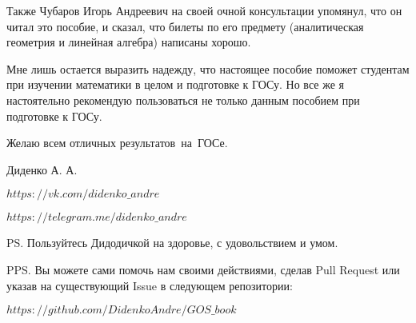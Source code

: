 Также Чубаров Игорь Андреевич на своей очной консультации упомянул, что он читал это пособие, и сказал, что билеты по его предмету (аналитическая геометрия и линейная алгебра) написаны хорошо.
 
Мне лишь остается выразить надежду, что настоящее пособие поможет студентам при изучении математики в целом и подготовке к ГОСу. Но все же я настоятельно рекомендую пользоваться не только данным пособием при подготовке к ГОСу.
\vspace*{\baselineskip}

\mbox{}

Желаю всем отличных результатов~на~ГОСе.

\mbox{}

\noindent Диденко А. А.

\noindent\href{https://vk.com/didenko_andre}{$https://vk.com/didenko\_andre$}

\noindent\href{https://telegram.me/didenko_andre}{$https://telegram.me/didenko\_andre$}

\mbox{}

\noindent PS. Пользуйтесь Дидодичкой на здоровье, с удовольствием и умом. \faSmileO

\mbox{}

\noindent PPS. Вы можете сами помочь нам своими действиями, сделав Pull Request или указав на существующий Issue в следующем репозитории:

\noindent\href{https://github.com/DidenkoAndre/GOS_book}{$https://github.com/DidenkoAndre/GOS\_book$}